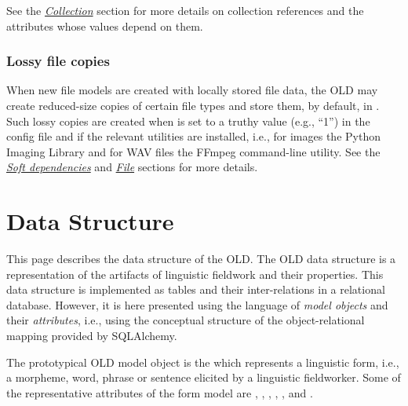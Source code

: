 \documentclass[letterpaper,10pt,english]{sphinxmanual}
\begin{document}
See the {\hyperref[datastructure:collection-data-structure]{\emph{Collection}}} section for more details on collection
references and the attributes whose values depend on them.


\subsubsection{Lossy file copies}
\label{interface:lossy-file-copies}
When new file models are created with locally stored file data, the OLD may
create reduced-size copies of certain file types and store them, by default, in
.  Such lossy copies are created when
 is set to a truthy value (e.g., ``1'') in the
config file and if the relevant utilities are installed, i.e., for images the
Python Imaging Library and for WAV files the FFmpeg command-line utility.  See
the {\hyperref[installation:soft-dependecies]{\emph{Soft dependencies}}} and {\hyperref[datastructure:file-data-structure]{\emph{File}}} sections for more
details.


\section{Data Structure}
\label{datastructure:data-structure}\label{datastructure::doc}\label{datastructure:id1}
This page describes the data structure of the OLD.  The OLD data structure is a
representation of the artifacts of linguistic fieldwork and their properties.
This data structure is implemented as tables and their inter-relations in a
relational database.  However, it is here presented using the language of
\emph{model objects} and their \emph{attributes}, i.e., using the conceptual structure of
the object-relational mapping provided by SQLAlchemy.

The prototypical OLD model object is the   which represents a linguistic
form, i.e., a morpheme, word, phrase or sentence elicited by a linguistic
fieldworker.  Some of the representative attributes of the form model are
, , , ,
,  and .
\end{document}
